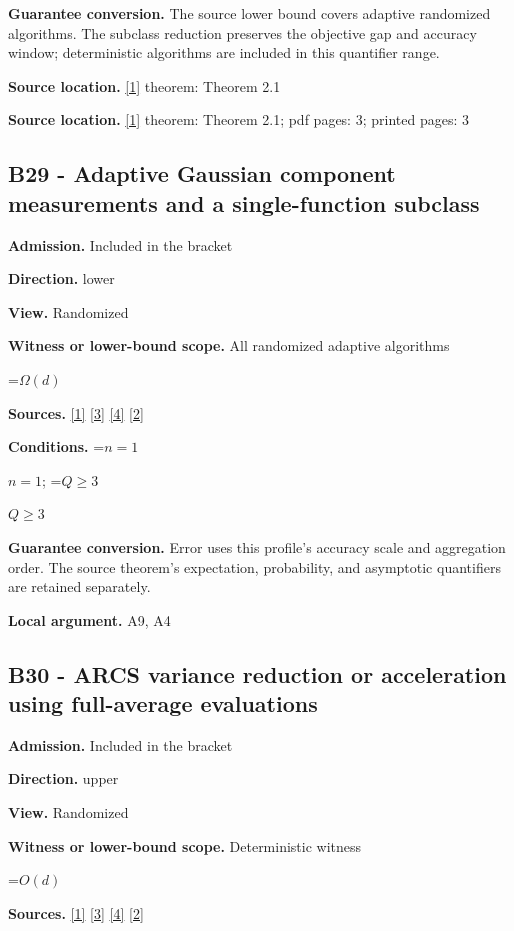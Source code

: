 \documentclass[10pt,a4paper]{article}
\newcommand{\AtlasMath}[1]{\par\begingroup\centering\setbox0=\hbox{$\displaystyle #1$}\ifdim\wd0>1.4\linewidth\typeout{ATLAS WIDE FORMULA: \the\wd0}\fi\ifdim\wd0>\linewidth\resizebox{\linewidth}{!}{\box0}\else\box0\fi\par\endgroup}
\newcommand{\AtlasInlineMath}[1]{\begingroup\setbox0=\hbox{$#1$}\ifdim\wd0>.4\linewidth\endgroup\AtlasMath{#1}\else\endgroup$#1$\fi}
\begin{document}
\textbf{Guarantee conversion.} The source lower bound covers adaptive randomized algorithms. The subclass reduction preserves the objective gap and accuracy window; deterministic algorithms are included in this quantifier range.

\textbf{Source location.} \href{https://arxiv.org/html/2610.00345v1}{[1]} theorem: Theorem 2.1

\textbf{Source location.} \href{https://arxiv.org/html/2610.00345v1}{[1]} theorem: Theorem 2.1; pdf pages: 3; printed pages: 3

\subsection{B29 - Adaptive Gaussian component measurements and a single-function subclass}
\textbf{Admission.} Included in the bracket

\textbf{Direction.} lower

\textbf{View.} Randomized

\textbf{Witness or lower-bound scope.} All randomized adaptive algorithms

\AtlasMath{\Omega(d)}
\textbf{Sources.} \href{https://arxiv.org/html/2610.00345v1}{[1]} \href{https://arxiv.org/html/2607.16558v2}{[3]} \href{https://www.mathnet.ru/php/archive.phtml?jrnid=mzm&option_lang=eng&paperid=1697&wshow=paper}{[4]} \href{https://arxiv.org/abs/2109.08858}{[2]}

\textbf{Conditions.} \AtlasInlineMath{n=1}; \AtlasInlineMath{Q\ge3}

\textbf{Guarantee conversion.} Error uses this profile's accuracy scale and aggregation order. The source theorem's expectation, probability, and asymptotic quantifiers are retained separately.

\textbf{Local argument.} A9, A4

\subsection{B30 - ARCS variance reduction or acceleration using full-average evaluations}
\textbf{Admission.} Included in the bracket

\textbf{Direction.} upper

\textbf{View.} Randomized

\textbf{Witness or lower-bound scope.} Deterministic witness

\AtlasMath{O(d)}
\textbf{Sources.} \href{https://arxiv.org/html/2610.00345v1}{[1]} \href{https://arxiv.org/html/2607.16558v2}{[3]} \href{https://www.mathnet.ru/php/archive.phtml?jrnid=mzm&option_lang=eng&paperid=1697&wshow=paper}{[4]} \href{https://arxiv.org/abs/2109.08858}{[2]}
\end{document}
